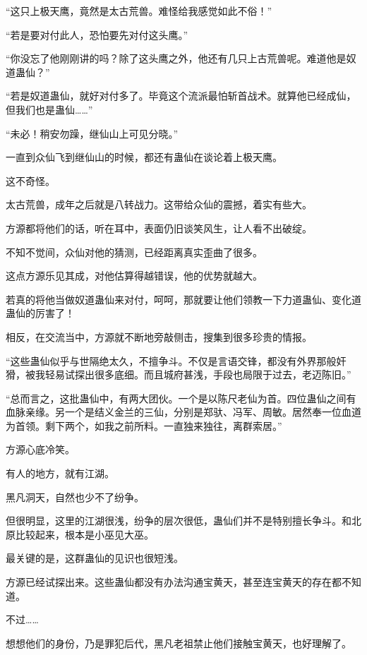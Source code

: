 
\begin{this_body}

“这只上极天鹰，竟然是太古荒兽。难怪给我感觉如此不俗！”

“若是要对付此人，恐怕要先对付这头鹰。”

“你没忘了他刚刚讲的吗？除了这头鹰之外，他还有几只上古荒兽呢。难道他是奴道蛊仙？”

“若是奴道蛊仙，就好对付多了。毕竟这个流派最怕斩首战术。就算他已经成仙，但我们也是蛊仙……”

“未必！稍安勿躁，继仙山上可见分晓。”

一直到众仙飞到继仙山的时候，都还有蛊仙在谈论着上极天鹰。

这不奇怪。

太古荒兽，成年之后就是八转战力。这带给众仙的震撼，着实有些大。

方源都将他们的话，听在耳中，表面仍旧谈笑风生，让人看不出破绽。

不知不觉间，众仙对他的猜测，已经距离真实歪曲了很多。

这点方源乐见其成，对他估算得越错误，他的优势就越大。

若真的将他当做奴道蛊仙来对付，呵呵，那就要让他们领教一下力道蛊仙、变化道蛊仙的厉害了！

相反，在交流当中，方源就不断地旁敲侧击，搜集到很多珍贵的情报。

“这些蛊仙似乎与世隔绝太久，不擅争斗。不仅是言语交锋，都没有外界那般奸猾，被我轻易试探出很多底细。而且城府甚浅，手段也局限于过去，老迈陈旧。”

“总而言之，这批蛊仙中，有两大团伙。一个是以陈尺老仙为首。四位蛊仙之间有血脉亲缘。另一个是结义金兰的三仙，分别是郑驮、冯军、周敏。居然奉一位血道为首领。剩下两个，如我之前所料。一直独来独往，离群索居。”

方源心底冷笑。

有人的地方，就有江湖。

黑凡洞天，自然也少不了纷争。

但很明显，这里的江湖很浅，纷争的层次很低，蛊仙们并不是特别擅长争斗。和北原比较起来，根本是小巫见大巫。

最关键的是，这群蛊仙的见识也很短浅。

方源已经试探出来。这些蛊仙都没有办法沟通宝黄天，甚至连宝黄天的存在都不知道。

不过……

想想他们的身份，乃是罪犯后代，黑凡老祖禁止他们接触宝黄天，也好理解了。


\end{this_body}
